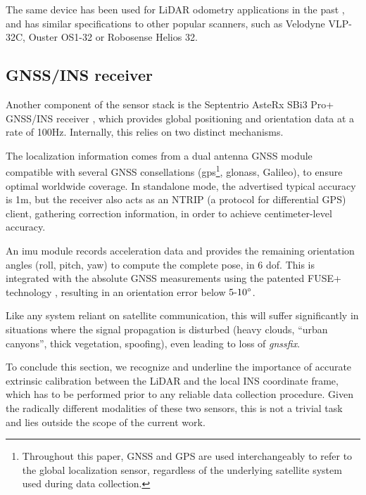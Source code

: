 The same device has been used for LiDAR odometry applications in the past \cite{kicp}, and has similar specifications to other popular scanners, such as Velodyne VLP-32C, Ouster OS1-32 or Robosense Helios 32.

\subsection{GNSS/INS receiver}

Another component of the sensor stack is the Septentrio AsteRx SBi3 Pro+ GNSS/INS receiver \cite{Septentrio_AsteRx_SBi3_Pro+}, which provides global positioning and orientation data at a rate of 100Hz. Internally, this relies on two distinct mechanisms.

The localization information comes from a dual antenna GNSS module compatible with several GNSS consellations (\eg \acrshort{gps}\footnote{Throughout this paper, GNSS and GPS are used interchangeably to refer to the global localization sensor, regardless of the underlying satellite system used during data collection.}, \acrshort{glonass}, Galileo), to ensure optimal worldwide coverage. In standalone mode, the advertised typical accuracy is 1m, but the receiver also acts as an NTRIP (a protocol for differential GPS) client, gathering correction information, in order to achieve centimeter-level accuracy.

An \acrfull{imu} module records acceleration data and provides the remaining orientation angles (roll, pitch, yaw) to compute the complete pose, in 6 \acrfull{dof}. This is integrated with the absolute GNSS measurements using the patented FUSE+ technology \cite{Septentrio_FUSE_Sensor_Fusion}, resulting in an orientation error below  $\text{5-10}\degree$.

Like any system reliant on satellite communication, this will suffer significantly in situations where the signal propagation is disturbed (heavy clouds, ``urban canyons'', thick vegetation, spoofing), even leading to loss of \emph{\gls{gnssfix}}.

To conclude this section, we recognize and underline the importance of accurate extrinsic calibration between the LiDAR and the local INS coordinate frame, which has to be performed prior to any reliable data collection procedure. Given the radically different modalities of these two sensors, this is not a trivial task \cite{lidar-gps-calib} and lies outside the scope of the current work.

